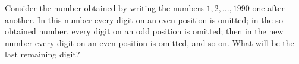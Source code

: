 Consider the number obtained by writing the numbers $1,2,\ldots,1990$ one after another. In this number every digit on an even position is omitted; in the so obtained number, every digit on an odd position is omitted; then in the new number every digit on an even position is omitted, and so on. What will be the last remaining digit?